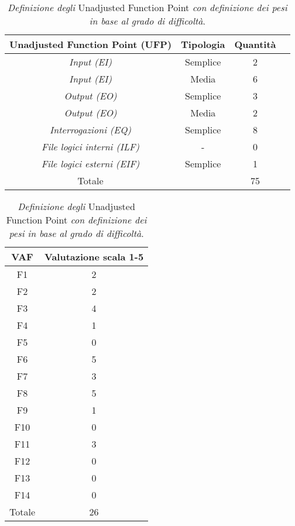 \begin{table}

\centering
\begin{tabular}{cccc}
\toprule
\textbf{Unadjusted Function Point (UFP)} & \textbf{Tipologia} & \textbf{Quantità}\\
\midrule
\textit{Input (EI)} & Semplice & 2\\
\textit{Input (EI)} & Media & 6\\
\textit{Output (EO)} & Semplice & 3\\
\textit{Output (EO)} & Media & 2\\
\textit{Interrogazioni (EQ)} & Semplice & 8\\
\textit{File logici interni (ILF)} & - & 0\\
\textit{File logici esterni (EIF)} & Semplice & 1\\
\bottomrule
Totale & & 75\\
\end{tabular}
\caption{\textit{Definizione degli} Unadjusted Function Point \textit{ con
definizione dei pesi in base al grado di difficoltà}.}
\label{tab:tdd2}

\end{table}

\begin{table}

\centering
\begin{tabular}{cc}
\toprule
\textbf{VAF} & Valutazione scala 1-5\\
\midrule
F1 & 2\\
F2 & 2\\
F3 & 4\\
F4 & 1\\
F5 & 0\\
F6 & 5\\
F7 & 3\\
F8 & 5\\
F9 & 1\\
F10 & 0\\
F11 & 3\\
F12 & 0\\
F13 & 0\\
F14 & 0\\
\bottomrule
Totale & 26\\
\end{tabular}
\caption{\textit{Definizione degli} Unadjusted Function Point \textit{ con
definizione dei pesi in base al grado di difficoltà}.}
\label{tab:tdd3}

\end{table}

